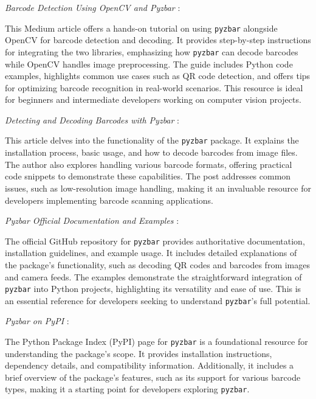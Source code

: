 \textit{Barcode Detection Using OpenCV and Pyzbar} \cite{Utekarbarcode:2023}: 

This Medium article offers a hands-on tutorial on using \texttt{pyzbar} alongside OpenCV for barcode detection and decoding. It provides step-by-step instructions for integrating the two libraries, emphasizing how \texttt{pyzbar} can decode barcodes while OpenCV handles image preprocessing. The guide includes Python code examples, highlights common use cases such as QR code detection, and offers tips for optimizing barcode recognition in real-world scenarios. This resource is ideal for beginners and intermediate developers working on computer vision projects.

\textit{Detecting and Decoding Barcodes with Pyzbar} \cite{Techtutorialsx:2020}: 

This article delves into the functionality of the \texttt{pyzbar} package. It explains the installation process, basic usage, and how to decode barcodes from image files. The author also explores handling various barcode formats, offering practical code snippets to demonstrate these capabilities. The post addresses common issues, such as low-resolution image handling, making it an invaluable resource for developers implementing barcode scanning applications.

\textit{Pyzbar Official Documentation and Examples}  \cite{pyzbargithub:2024}: 

The official GitHub repository for \texttt{pyzbar} provides authoritative documentation, installation guidelines, and example usage. It includes detailed explanations of the package’s functionality, such as decoding QR codes and barcodes from images and camera feeds. The examples demonstrate the straightforward integration of \texttt{pyzbar} into Python projects, highlighting its versatility and ease of use. This is an essential reference for developers seeking to understand \texttt{pyzbar}'s full potential.

\textit{Pyzbar on PyPI} \cite{pyzbarpypi:2024}: 

The Python Package Index (PyPI) page for \texttt{pyzbar} is a foundational resource for understanding the package's scope. It provides installation instructions, dependency details, and compatibility information. Additionally, it includes a brief overview of the package’s features, such as its support for various barcode types, making it a starting point for developers exploring \texttt{pyzbar}.